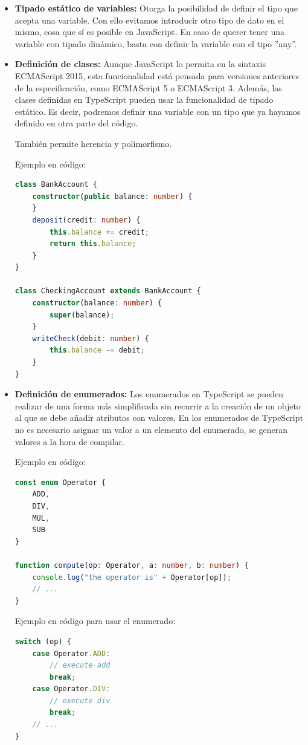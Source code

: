 \documentclass[spanish,12pt, a4paper, twoside]{paper}
\begin{document}
\begin{itemize}
\item\textbf{Tipado estático de variables:} Otorga la posibilidad de definir el tipo que acepta una variable. Con ello evitamos introducir otro tipo de dato en el mismo, cosa que sí es posible en JavaScript. En caso de querer tener una variable con tipado dinámico, basta con definir la variable con el tipo ''any''.
\item\textbf{Definición de clases:} Aunque JavaScript lo permita en la sintaxis ECMAScript 2015, esta funcionalidad está pensada para versiones anteriores de la especificación, como ECMAScript 5 o ECMAScript 3. Además, las clases definidas en TypeScript pueden usar la funcionalidad de tipado estático. Es decir, podremos definir una variable con un tipo que ya hayamos definido en otra parte del código.

También permite herencia y polimorfismo.

Ejemplo en código:
\begin{lstlisting}[language=TypeScript]
class BankAccount {  
    constructor(public balance: number) {  
    }  
    deposit(credit: number) {  
        this.balance += credit;  
        return this.balance;  
    }  
}

class CheckingAccount extends BankAccount {  
    constructor(balance: number) {  
        super(balance);  
    }  
    writeCheck(debit: number) {  
        this.balance -= debit;  
    }  
}
\end{lstlisting}

\item\textbf{Definición de enumerados:} Los enumerados en TypeScript se pueden realizar de una forma más simplificada sin recurrir a la creación de un objeto al que se debe añadir atributos con valores. En los enumerados de TypeScript no es necesario asignar un valor a un elemento del enumerado, se generan valores a la hora de compilar.

Ejemplo en código:
\begin{lstlisting}[language=TypeScript]
const enum Operator {  
    ADD,  
    DIV,  
    MUL,  
    SUB  
}

function compute(op: Operator, a: number, b: number) {  
    console.log("the operator is" + Operator[op]);  
    // ...  
}
\end{lstlisting}

Ejemplo en código para usar el enumerado:
\begin{lstlisting}[language=TypeScript]
switch (op) {  
    case Operator.ADD:  
        // execute add  
        break;  
    case Operator.DIV:  
        // execute div  
        break;  
    // ...  
}
\end{lstlisting}


\end{itemize}
\end{document}
